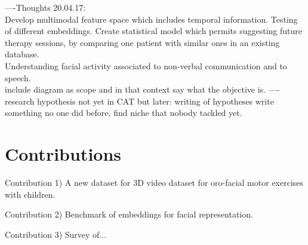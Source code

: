 ----Thoughts 20.04.17:\\
Develop multimodal feature space which includes temporal information. Testing of different embeddings. Create statistical model which permits suggesting future therapy sessions, by comparing one patient with similar ones in an existing database.\\
Understanding facial activity associated to non-verbal communication and to speech.\\ include diagram as scope and in that context say what the objective is.
----\\
research hypothesis not yet in CAT but later: writing of hypotheses write something no one did before, find niche that nobody tackled yet. 

\section{Contributions}

Contribution 1) A new dataset for 3D video dataset for oro-facial motor exercises with children.

Contribution 2) Benchmark of embeddings for facial representation.

Contribution 3) Survey of...


